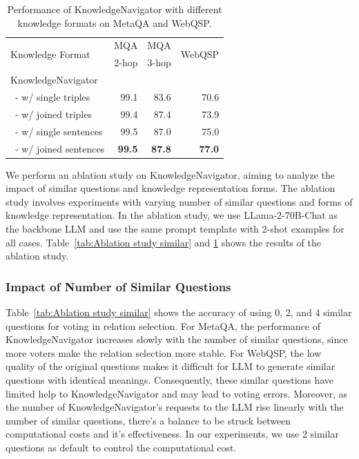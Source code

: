 \documentclass{article}
\begin{document}
\begin{table}
    \centering
    \begin{tabular}{lrrr}
        \toprule
        \multirow{2}{*}{Knowledge Format} & \multicolumn{1}{c}{MQA} & \multicolumn{1}{c}{MQA} & \multirow{2}{*}{WebQSP} \\
        & \multicolumn{1}{c}{2-hop} & \multicolumn{1}{c}{3-hop} & \\
        \midrule
        KnowledgeNavigator \\
        ~- w/ single triples        & 99.1    & 83.6 & 70.6 \\
        ~- w/ joined triples        & 99.4    & 87.4  & 73.9 \\
        ~- w/ single sentences   & 99.5    & 87.0 & 75.0 \\
        ~- w/ joined sentences   & \textbf{99.5} & \textbf{87.8} & \textbf{77.0} \\
        \bottomrule
    \end{tabular}
    \caption{Performance of KnowledgeNavigator with different knowledge formats on MetaQA and WebQSP.}
    \label{tab:Ablation study knowledge}
\end{table}



We perform an ablation study on KnowledgeNavigator, aiming to analyze the impact of similar questions and knowledge representation forms. The ablation study involves experiments with varying number of similar questions and forms of knowledge representation. In the ablation study, we use LLama-2-70B-Chat as the backbone LLM and use the same prompt template with 2-shot examples for all cases. Table~\ref{tab:Ablation study similar} and \ref{tab:Ablation study knowledge} shows the results of the ablation study.



\subsubsection{Impact of Number of Similar Questions}


Table~\ref{tab:Ablation study similar} shows the accuracy of using 0, 2, and 4 similar questions for voting in relation selection. For MetaQA, the performance of KnowledgeNavigator increases slowly with the number of similar questions, since more voters make the relation selection more stable. For WebQSP, the low quality of the original questions makes it difficult for LLM to generate similar questions with identical meanings.  Consequently, these similar questions have limited help to KnowledgeNavigator and may lead to voting errors. Moreover, as the number of KnowledgeNavigator's requests to the LLM rise linearly with the number of similar questions, there's a balance to be struck between computational costs and it's effectiveness. In our experiments, we use 2 similar questions as default to control the computational cost.
\end{document}
